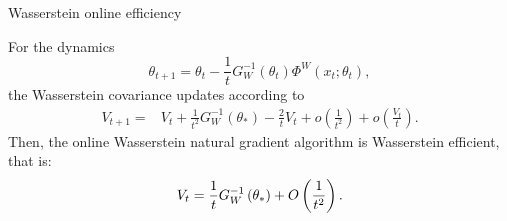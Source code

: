 \documentclass{beamer}
\begin{document}
\begin{frame}{Wasserstein online efficiency}
\begin{corollary}\label{WNE}
    For the dynamics
\begin{equation*}
    \theta_{t+1} = \theta_t - \frac{1}{t}G_W^{-1}(\theta_t)\Phi^W(x_t; \theta_t),
\end{equation*}
the Wasserstein covariance updates according to
\begin{equation*}
    \begin{aligned}
     V_{t+1} = & V_t + \frac{1}{t^2} G_W^{-1}(\theta_*) - \frac{2}{t} V_t + o\left( \frac{1}{t^2} \right) + o(\frac{V_t}{t}).
	\end{aligned}
\end{equation*}
Then, the online Wasserstein natural gradient algorithm is Wasserstein efficient, that is:
\begin{equation*}\label{Cramer-Rao}
    V_t = \frac{1}{t}G_W^{-1}\left( \theta_* \right) + O\left( \frac{1}{t^2} \right).
\end{equation*}
\end{corollary}
\end{frame}
\end{document}
